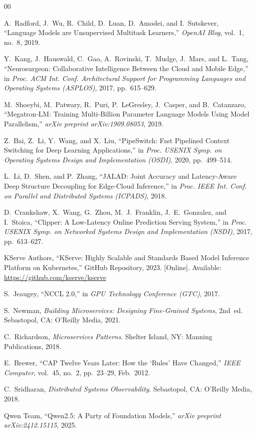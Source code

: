 \documentclass[conference]{IEEEtran}
\begin{document}
\begin{thebibliography}{00}

A.~Radford, J.~Wu, R.~Child, D.~Luan, D.~Amodei, and I.~Sutskever,
``Language Models are Unsupervised Multitask Learners,''
\textit{OpenAI Blog}, vol.~1, no.~8, 2019.

Y.~Kang, J.~Hauswald, C.~Gao, A.~Rovinski, T.~Mudge, J.~Mars, and L.~Tang,
``Neurosurgeon: Collaborative Intelligence Between the Cloud and Mobile Edge,''
in \textit{Proc. ACM Int. Conf. Architectural Support for Programming Languages
and Operating Systems (ASPLOS)}, 2017, pp.~615--629.

M.~Shoeybi, M.~Patwary, R.~Puri, P.~LeGresley, J.~Casper, and B.~Catanzaro,
``Megatron-LM: Training Multi-Billion Parameter Language Models Using Model
Parallelism,'' \textit{arXiv preprint arXiv:1909.08053}, 2019.

Z.~Bai, Z.~Li, Y.~Wang, and X.~Liu,
``PipeSwitch: Fast Pipelined Context Switching for Deep Learning Applications,''
in \textit{Proc. USENIX Symp. on Operating Systems Design and Implementation
(OSDI)}, 2020, pp.~499--514.

L.~Li, D.~Shen, and P.~Zhang,
``JALAD: Joint Accuracy and Latency-Aware Deep Structure Decoupling for
Edge-Cloud Inference,''
in \textit{Proc. IEEE Int. Conf. on Parallel and Distributed Systems
(ICPADS)}, 2018.

D.~Crankshaw, X.~Wang, G.~Zhou, M.~J.~Franklin, J.~E.~Gonzalez, and
I.~Stoica,
``Clipper: A Low-Latency Online Prediction Serving System,''
in \textit{Proc. USENIX Symp. on Networked Systems Design and Implementation
(NSDI)}, 2017, pp.~613--627.

KServe Authors,
``KServe: Highly Scalable and Standards Based Model Inference Platform on
Kubernetes,'' GitHub Repository, 2023.
[Online]. Available: \url{https://github.com/kserve/kserve}

S.~Jeaugey,
``NCCL 2.0,''
in \textit{GPU Technology Conference (GTC)}, 2017.

S.~Newman,
\textit{Building Microservices: Designing Fine-Grained Systems}, 2nd~ed.
Sebastopol, CA: O'Reilly Media, 2021.

C.~Richardson,
\textit{Microservices Patterns}.
Shelter Island, NY: Manning Publications, 2018.

E.~Brewer,
``CAP Twelve Years Later: How the `Rules' Have Changed,''
\textit{IEEE Computer}, vol.~45, no.~2, pp.~23--29, Feb.~2012.

C.~Sridharan,
\textit{Distributed Systems Observability}.
Sebastopol, CA: O'Reilly Media, 2018.

Qwen Team,
``Qwen2.5: A Party of Foundation Models,''
\textit{arXiv preprint arXiv:2412.15115}, 2025.

\end{thebibliography}
\end{document}
